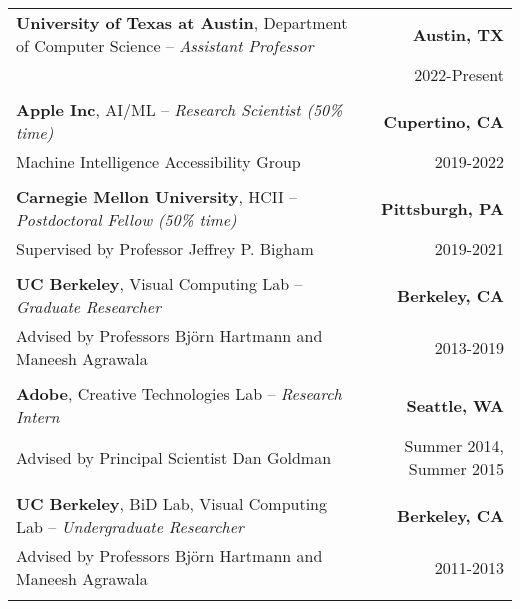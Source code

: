 \begin{longtable}{Xr}
	\textbf{University of Texas at Austin}, Department of Computer Science -- \textit{Assistant Professor} & \textbf{Austin, TX} \\
	 & 2022-Present \\
	\\

	\textbf{Apple Inc}, AI/ML -- \textit{Research Scientist (50\% time)} & \textbf{Cupertino, CA} \\
	Machine Intelligence Accessibility Group & 2019-2022 \\
	\\

	\textbf{Carnegie Mellon University}, HCII -- \textit{Postdoctoral Fellow (50\% time)} & \textbf{Pittsburgh, PA} \\
	Supervised by Professor Jeffrey P. Bigham & 2019-2021 \\
	\\

	\textbf{UC Berkeley}, Visual Computing Lab -- \textit{Graduate Researcher} & \textbf{Berkeley, CA} \\
	Advised by Professors Björn Hartmann and Maneesh Agrawala & 2013-2019 \\
	\\

	\textbf{Adobe}, Creative Technologies Lab -- \textit{Research Intern} & \textbf{Seattle, WA} \\
	Advised by Principal Scientist Dan Goldman & Summer 2014, Summer 2015 \\
	\\

	\textbf{UC Berkeley}, BiD Lab, Visual Computing Lab -- \textit{Undergraduate Researcher} & \textbf{Berkeley, CA} \\
	Advised by Professors Björn Hartmann and Maneesh Agrawala & 2011-2013 \\
	\\

\end{longtable}